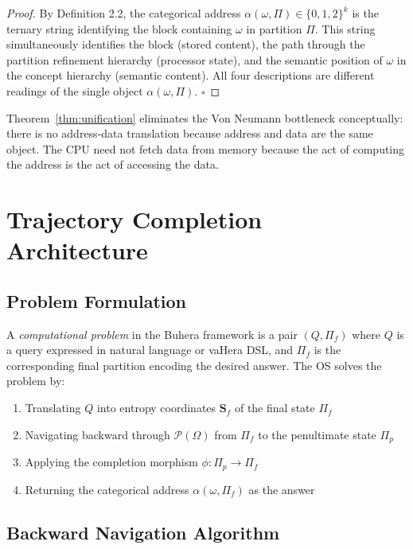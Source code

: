\documentclass[12pt,twocolumn]{article}
\begin{document}
\begin{proof}
By Definition 2.2, the categorical address $\alpha(\omega, \Pi) \in \{0,1,2\}^k$ is the ternary string identifying the block containing $\omega$ in partition $\Pi$. This string simultaneously identifies the block (stored content), the path through the partition refinement hierarchy (processor state), and the semantic position of $\omega$ in the concept hierarchy (semantic content). All four descriptions are different readings of the single object $\alpha(\omega, \Pi)$. $\square$
\end{proof}

Theorem~\ref{thm:unification} eliminates the Von Neumann bottleneck conceptually: there is no address-data translation because address and data are the same object. The CPU need not fetch data from memory because the act of computing the address is the act of accessing the data.



\section{Trajectory Completion Architecture}
\label{sec:trajectory}

\subsection{Problem Formulation}

A \emph{computational problem} in the Buhera framework is a pair $(Q, \Pi_f)$ where $Q$ is a query expressed in natural language or vaHera DSL, and $\Pi_f$ is the corresponding final partition encoding the desired answer. The OS solves the problem by:

\begin{enumerate}
\item Translating $Q$ into entropy coordinates $\mathbf{S}_f$ of the final state $\Pi_f$
\item Navigating backward through $\mathcal{P}(\Omega)$ from $\Pi_f$ to the penultimate state $\Pi_p$
\item Applying the completion morphism $\phi: \Pi_p \to \Pi_f$
\item Returning the categorical address $\alpha(\omega, \Pi_f)$ as the answer
\end{enumerate}

\subsection{Backward Navigation Algorithm}
\end{document}
